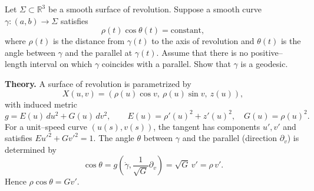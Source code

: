 \begin{problem}
\label{prob:cp-vii-0063}
Let $\Sigma\subset\mathbb R^3$ be a smooth surface of revolution.
Suppose a smooth curve $\gamma:(a,b)\to\Sigma$ satisfies
\[
\rho(t)\cos\theta(t)=\text{constant},
\]
where $\rho(t)$ is the distance from $\gamma(t)$ to the axis of revolution
and $\theta(t)$ is the angle between $\gamma$ and the parallel at $\gamma(t)$.
Assume that there is no positive--length interval on which $\gamma$ coincides
with a parallel. Show that $\gamma$ is a geodesic.

\medskip
\textbf{Theory.}
A surface of revolution is parametrized by
\[
X(u,v) = (\rho(u)\cos v,\ \rho(u)\sin v,\ z(u)),
\]
with induced metric
\[
g = E(u)\,du^2 + G(u)\,dv^2,\qquad
E(u)=\rho'(u)^2+z'(u)^2,\quad G(u)=\rho(u)^2.
\]
For a unit--speed curve $(u(s),v(s))$, the tangent has components
$u',v'$ and satisfies $E u'^2 + G v'^2 = 1$. The angle $\theta$ between
$\gamma$ and the parallel (direction $\partial_v$) is determined by
\[
\cos\theta = g\!\left(\dot\gamma,\frac{1}{\sqrt{G}}\partial_v\right)
= \sqrt{G}\,v' = \rho\,v'.
\]
Hence $\rho\cos\theta = G v'$.

\medskip
\end{problem}

